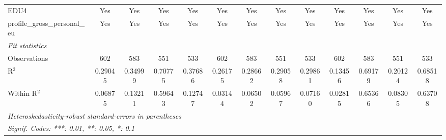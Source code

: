 \begin{tabular}{lcccccccccccc}
   EDU4                                      & Yes      & Yes      & Yes      & Yes      & Yes           & Yes      & Yes      & Yes      & Yes      & Yes      & Yes      & Yes\\  
   profile\_gross\_personal\_eu              & Yes      & Yes      & Yes      & Yes      & Yes           & Yes      & Yes      & Yes      & Yes      & Yes      & Yes      & Yes\\  
   \midrule
   \emph{Fit statistics}\\
   Observations                              & 602      & 583      & 551      & 533      & 602           & 583      & 551      & 533      & 602      & 583      & 551      & 533\\  
   R$^2$                                     & 0.29045  & 0.34999  & 0.70775  & 0.37686  & 0.26175       & 0.28662  & 0.29058  & 0.29861  & 0.13456  & 0.69179  & 0.20124  & 0.68518\\  
   Within R$^2$                              & 0.06875  & 0.13211  & 0.59643  & 0.12747  & 0.03144       & 0.06502  & 0.05967  & 0.07160  & 0.02815  & 0.65366  & 0.08305  & 0.63708\\  
   \midrule \midrule
   \multicolumn{13}{l}{\emph{Heteroskedasticity-robust standard-errors in parentheses}}\\
   \multicolumn{13}{l}{\emph{Signif. Codes: ***: 0.01, **: 0.05, *: 0.1}}\\
\end{tabular}
\par\endgroup



